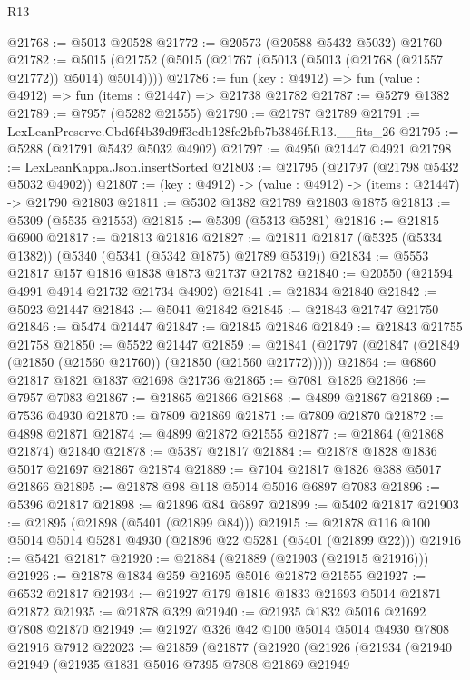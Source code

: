 \begin{lexlean}{R13}
\begin{coremodule}
@21768 := @5013 @20528
@21772 := @20573 (@20588 @5432 @5032) @21760
@21782 := @5015 (@21752 (@5015 (@21767 (@5013 (@5013 (@21768 (@21557 @21772)) @5014) @5014))))
@21786 := fun (key : @4912) => fun (value : @4912) => fun (items : @21447) => @21738 @21782
@21787 := @5279 @1382
@21789 := @7957 (@5282 @21555)
@21790 := @21787 @21789
@21791 := LexLeanPreserve.Cbd6f4b39d9ff3edb128fe2bfb7b3846f.R13.__fits_26
@21795 := @5288 (@21791 @5432 @5032 @4902)
@21797 := @4950 @21447 @4921
@21798 := LexLeanKappa.Json.insertSorted
@21803 := @21795 (@21797 (@21798 @5432 @5032 @4902))
@21807 := (key : @4912) -> (value : @4912) -> (items : @21447) -> @21790 @21803
@21811 := @5302 @1382 @21789 @21803 @1875
@21813 := @5309 (@5535 @21553)
@21815 := @5309 (@5313 @5281)
@21816 := @21815 @6900
@21817 := @21813 @21816
@21827 := @21811 @21817 (@5325 (@5334 @1382)) (@5340 (@5341 (@5342 @1875) @21789 @5319))
@21834 := @5553 @21817 @157 @1816 @1838 @1873 @21737 @21782
@21840 := @20550 (@21594 @4991 @4914 @21732 @21734 @4902)
@21841 := @21834 @21840
@21842 := @5023 @21447
@21843 := @5041 @21842
@21845 := @21843 @21747 @21750
@21846 := @5474 @21447
@21847 := @21845 @21846
@21849 := @21843 @21755 @21758
@21850 := @5522 @21447
@21859 := @21841 (@21797 (@21847 (@21849 (@21850 (@21560 @21760)) (@21850 (@21560 @21772)))))
@21864 := @6860 @21817 @1821 @1837 @21698 @21736
@21865 := @7081 @1826
@21866 := @7957 @7083
@21867 := @21865 @21866
@21868 := @4899 @21867
@21869 := @7536 @4930
@21870 := @7809 @21869
@21871 := @7809 @21870
@21872 := @4898 @21871
@21874 := @4899 @21872 @21555
@21877 := @21864 (@21868 @21874) @21840
@21878 := @5387 @21817
@21884 := @21878 @1828 @1836 @5017 @21697 @21867 @21874
@21889 := @7104 @21817 @1826 @388 @5017 @21866
@21895 := @21878 @98 @118 @5014 @5016 @6897 @7083
@21896 := @5396 @21817
@21898 := @21896 @84 @6897
@21899 := @5402 @21817
@21903 := @21895 (@21898 (@5401 (@21899 @84)))
@21915 := @21878 @116 @100 @5014 @5014 @5281 @4930 (@21896 @22 @5281 (@5401 (@21899 @22)))
@21916 := @5421 @21817
@21920 := @21884 (@21889 (@21903 (@21915 @21916)))
@21926 := @21878 @1834 @259 @21695 @5016 @21872 @21555
@21927 := @6532 @21817
@21934 := @21927 @179 @1816 @1833 @21693 @5014 @21871 @21872
@21935 := @21878 @329
@21940 := @21935 @1832 @5016 @21692 @7808 @21870
@21949 := @21927 @326 @42 @100 @5014 @5014 @4930 @7808 @21916 @7912
@22023 := @21859
    (@21877
      (@21920
        (@21926
          (@21934
            (@21940
              @21949
              (@21935
                @1831
                @5016
                @7395
                @7808
                @21869
                @21949

\end{coremodule}
\end{lexlean}
